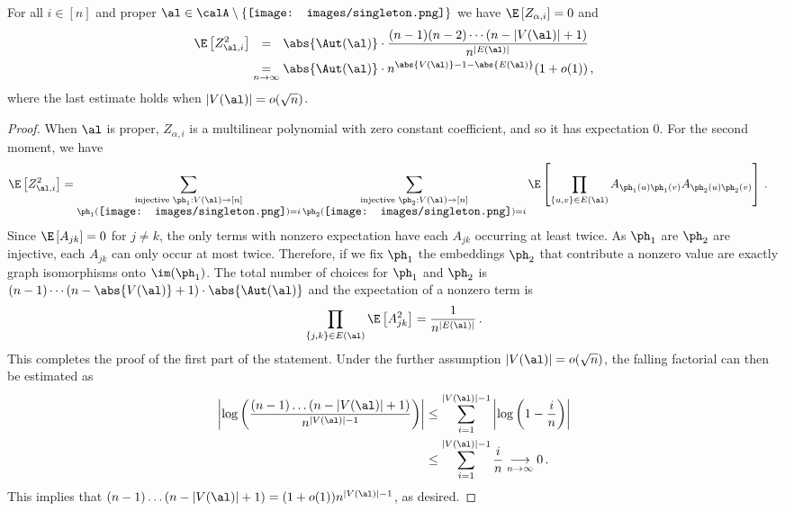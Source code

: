 \documentclass[12pt]{article}
\newcommand{\rootpic}{\vcenter{\hbox{\texttt{[image: images/singleton.png]}}}}
\newcommand{\smallrootpic}{\vcenter{\hbox{\texttt{[image: images/singleton.png]}}}}
\begin{document}
\begin{lemma}\label{lem:variance}
    For all $i \in [n]$ and proper $\al \in \calA\setminus\{\rootpic\}$ 
    we have $\E \left[Z_{\alpha,i}\right]=0$ and
    \begin{align*}
        \E\left[Z_{\al, i}^2\right] &\underset{\phantom{n\to\infty}}{=} \abs{\Aut(\al)} \cdot \frac{(n-1)(n-2)\cdots(n-|V(\al)| + 1)}{n^{|E(\al)|}} \\
        &\underset{n\to\infty}{=} \abs{\Aut(\al)} \cdot n^{\abs{V(\al)} - 1 - \abs{E(\al)}} (1 + o(1))\,,
    \end{align*}
    where the last estimate holds when $|V(\al)| = o(\sqrt{n})$.
\end{lemma}
\begin{proof}
    When $\al$ is proper, $Z_{\alpha,i}$ is a multilinear polynomial with zero constant coefficient, and so it has expectation 0. For the second moment, we have
    \begin{align*}
        \E\left[Z_{\al, i}^2\right] &= \sum_{\substack{\text{injective }\ph_1: V(\al) \to [n]\\\ph_1(\smallrootpic) = i}} \sum_{\substack{\text{injective }\ph_2: V(\al) \to [n]\\\ph_2(\smallrootpic) = i}} \E \left[\prod_{\{u,v\} \in E(\al)} A_{\ph_1(u)\ph_1(v)} A_{\ph_2(u)\ph_2(v)}\right]\,.
    \end{align*}
    Since $\E \left[A_{jk}\right] = 0$ for $j\neq k$, the only terms with nonzero expectation have each $A_{jk}$ occurring at least twice.
    As $\ph_1$ are $\ph_2$ are injective, each $A_{jk}$ can only occur at most twice.
    Therefore, if we fix $\ph_1$ the embeddings $\ph_2$ that contribute a nonzero value are exactly
    graph isomorphisms onto $\im(\ph_1)$.
    The total number of choices for $\ph_1$ and $\ph_2$ is $(n-1)\cdots(n-\abs{V(\al)}+1) \cdot \abs{\Aut(\al)}$ and the expectation of a nonzero term is
    \[
        \prod_{\{j,k\} \in E(\al)}\E\left[A_{jk}^2\right] = \frac{1}{n^{|E(\al)|}} \,.
    \]
    This completes the proof of the first part of the statement. Under the further assumption $|V(\al)|=o(\sqrt n)$, the falling factorial can then be estimated  as
    \begin{align*}
        \left|\log\left(\frac{(n-1)\ldots(n-|V(\al)|+1)}{n^{|V(\al)|-1}}\right)\right| &\le \sum_{i=1}^{|V(\al)|-1} \left|\log\left(1-\frac i n\right)\right|\\
        &\le \sum_{i=1}^{|V(\al)|-1} \frac i n\underset{n\to\infty}{\longrightarrow} 0\,.
    \end{align*}
    This implies that $(n-1)\ldots(n-|V(\al)|+1)=(1+o(1)) n^{|V(\al)|-1}$, as desired.
\end{proof}
\end{document}
